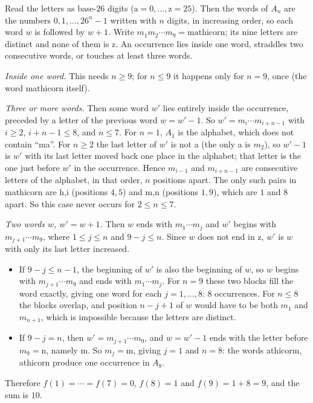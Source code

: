 Read the letters as base-$26$ digits ($\text{a}=0,\dots,\text{z}=25$). Then the words of $A_n$ are the numbers $0,1,\dots,26^n-1$ written with $n$ digits, in increasing order, so each word $w$ is followed by $w+1$. Write $m_1m_2\cdots m_9=\text{mathicorn}$; its nine letters are distinct and none of them is z. An occurrence lies inside one word, straddles two consecutive words, or touches at least three words.

\emph{Inside one word.} This needs $n\ge9$; for $n\le9$ it happens only for $n=9$, once (the word mathicorn itself).

\emph{Three or more words.} Then some word $w'$ lies entirely inside the occurrence, preceded by a letter of the previous word $w=w'-1$. So $w'=m_i\cdots m_{i+n-1}$ with $i\ge2$, $i+n-1\le8$, and $n\le7$. For $n=1$, $A_1$ is the alphabet, which does not contain ``ma''. For $n\ge2$ the last letter of $w'$ is not a (the only a is $m_2$), so $w'-1$ is $w'$ with its last letter moved back one place in the alphabet; that letter is the one just before $w'$ in the occurrence. Hence $m_{i-1}$ and $m_{i+n-1}$ are consecutive letters of the alphabet, in that order, $n$ positions apart. The only such pairs in mathicorn are h,i (positions $4,5$) and m,n (positions $1,9$), which are $1$ and $8$ apart. So this case never occurs for $2\le n\le7$.

\emph{Two words $w$, $w'=w+1$.} Then $w$ ends with $m_1\cdots m_j$ and $w'$ begins with $m_{j+1}\cdots m_9$, where $1\le j\le n$ and $9-j\le n$. Since $w$ does not end in z, $w'$ is $w$ with only its last letter increased.
\begin{itemize}
\item If $9-j\le n-1$, the beginning of $w'$ is also the beginning of $w$, so $w$ begins with $m_{j+1}\cdots m_9$ and ends with $m_1\cdots m_j$. For $n=9$ these two blocks fill the word exactly, giving one word for each $j=1,\dots,8$: $8$ occurrences. For $n\le8$ the blocks overlap, and position $n-j+1$ of $w$ would have to be both $m_1$ and $m_{n+1}$, which is impossible because the letters are distinct.
\item If $9-j=n$, then $w'=m_{j+1}\cdots m_9$, and $w=w'-1$ ends with the letter before $m_9=\text{n}$, namely m. So $m_j=\text{m}$, giving $j=1$ and $n=8$: the words athicorm, athicorn produce one occurrence in $A_8$.
\end{itemize}

Therefore $f(1)=\cdots=f(7)=0$, $f(8)=1$ and $f(9)=1+8=9$, and the sum is $\boxed{10}$.
